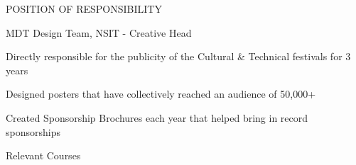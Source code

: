 \documentclass[../resume.tex]{subfiles}
\begin{document}
{\begin{rSection}{POSITION OF RESPONSIBILITY}
    \begin{rSubsection}
        {MDT Design Team, NSIT}
        {  - }
        {Creative Head}{}

        \item Directly responsible for the publicity of the Cultural \& Technical festivals for 3 years
        \item Designed posters that have collectively reached an audience of 50,000+
        \item Created Sponsorship Brochures each year that helped bring in record sponsorships
    \end{rSubsection}

\end{rSection}

\begin{rSection}{Relevant Courses}
     \tab{}  
    \\  \tab{}  
    \\  \tab{}  
    \\  \tab{}  
\end{rSection}
}
\end{document}
